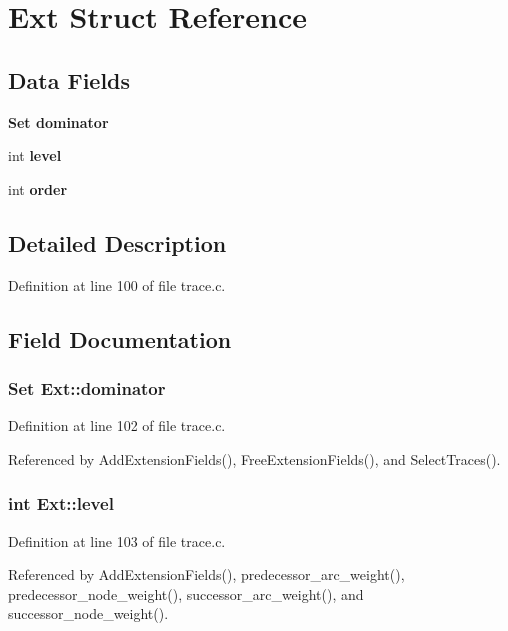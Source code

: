 \section{Ext Struct Reference}
\label{structExt}
\subsection*{Data Fields}
\begin{CompactItemize}
\item 
\bf{Set} \bf{dominator}
\item 
int \bf{level}
\item 
int \bf{order}
\end{CompactItemize}


\subsection{Detailed Description}




Definition at line 100 of file trace.c.

\subsection{Field Documentation}
\subsubsection{\setlength{\rightskip}{0pt plus 5cm}\bf{Set} \bf{Ext::dominator}}\label{structExt_54553f0f27116fbb7aa0379b6c3ec162}




Definition at line 102 of file trace.c.

Referenced by Add\-Extension\-Fields(), Free\-Extension\-Fields(), and Select\-Traces().
\subsubsection{\setlength{\rightskip}{0pt plus 5cm}int \bf{Ext::level}}\label{structExt_373d327bc17c9496fd36a13b9bf84ddd}




Definition at line 103 of file trace.c.

Referenced by Add\-Extension\-Fields(), predecessor\_\-arc\_\-weight(), predecessor\_\-node\_\-weight(), successor\_\-arc\_\-weight(), and successor\_\-node\_\-weight().
